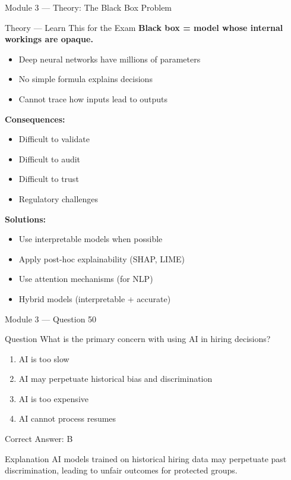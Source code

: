 \documentclass[aspectratio=169,10pt]{beamer}
\newcommand{\question}[1]{%
	\begin{block}{Question}
		#1
	\end{block}
}
\newcommand{\options}[4]{%
	\begin{enumerate}[label=\Alph*.,leftmargin=*]
		\item #1
		\item #2
		\item #3
		\item #4
	\end{enumerate}
}
\newcommand{\answerbox}[1]{%
	\begin{exampleblock}{Correct Answer: #1}
	\end{exampleblock}
}
\newcommand{\explain}[1]{%
	\begin{block}{Explanation}
		\small #1
	\end{block}
}
\newcommand{\theory}[1]{%
	\begin{block}{Theory --- Learn This for the Exam}
		\small #1
	\end{block}
}
\begin{document}
	\begin{frame}{Module 3 --- Theory: The Black Box Problem}
		\theory{
			\textbf{Black box = model whose internal workings are opaque.}
			\begin{itemize}
				\item Deep neural networks have millions of parameters
				\item No simple formula explains decisions
				\item Cannot trace how inputs lead to outputs
			\end{itemize}
			\textbf{Consequences:}
			\begin{itemize}
				\item Difficult to validate
				\item Difficult to audit
				\item Difficult to trust
				\item Regulatory challenges
			\end{itemize}
			\textbf{Solutions:}
			\begin{itemize}
				\item Use interpretable models when possible
				\item Apply post-hoc explainability (SHAP, LIME)
				\item Use attention mechanisms (for NLP)
				\item Hybrid models (interpretable + accurate)
			\end{itemize}
		}
	\end{frame}
	
	\begin{frame}{Module 3 --- Question 50}
		\question{What is the primary concern with using AI in hiring decisions?}
		\options{AI is too slow}{AI may perpetuate historical bias and discrimination}{AI is too expensive}{AI cannot process resumes}
		\answerbox{B}
		\explain{AI models trained on historical hiring data may perpetuate past discrimination, leading to unfair outcomes for protected groups.}
	\end{frame}
	
\end{document}
